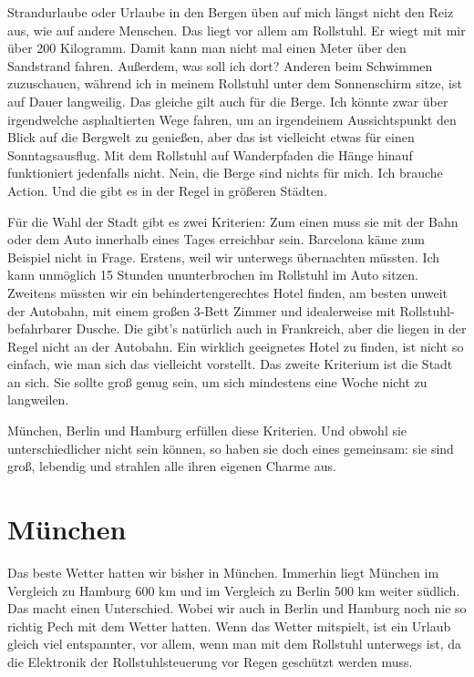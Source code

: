 \documentclass[fontsize=14pt,a4paper,headinclude,DIV=calc,automark]{scrbook}
\begin{document}
Strandurlaube oder Urlaube in den Bergen üben auf mich längst nicht den Reiz aus, wie auf andere Menschen. Das liegt vor allem am Rollstuhl. Er wiegt mit mir über 200 Kilogramm. Damit kann man nicht mal einen Meter über den Sandstrand fahren. Außerdem, was soll ich dort? Anderen beim Schwimmen zuzuschauen, während ich in meinem Rollstuhl unter dem Sonnenschirm sitze, ist auf Dauer langweilig. Das gleiche gilt auch für die Berge. Ich könnte zwar über irgendwelche asphaltierten Wege fahren, um an irgendeinem Aussichtspunkt den Blick auf die Bergwelt zu genießen, aber das ist vielleicht etwas für einen Sonntagsausflug. Mit dem Rollstuhl auf Wanderpfaden die Hänge hinauf funktioniert jedenfalls nicht. Nein, die Berge sind nichts für mich. Ich brauche Action. Und die gibt es in der Regel in größeren Städten.

Für die Wahl der Stadt gibt es zwei Kriterien: Zum einen muss sie mit der Bahn oder dem Auto innerhalb eines Tages erreichbar sein. Barcelona käme zum Beispiel nicht in Frage. Erstens, weil wir unterwegs übernachten müssten. Ich kann unmöglich 15 Stunden ununterbrochen im Rollstuhl im Auto sitzen. Zweitens müssten wir ein behindertengerechtes Hotel finden, am besten unweit der Autobahn, mit einem großen 3-Bett Zimmer und idealerweise mit Rollstuhl-befahrbarer Dusche. Die gibt’s natürlich auch in Frankreich, aber die liegen in der Regel nicht an der Autobahn. Ein wirklich geeignetes Hotel zu finden, ist nicht so einfach, wie man sich das vielleicht vorstellt. Das zweite Kriterium ist die Stadt an sich. Sie sollte groß genug sein, um sich mindestens eine Woche nicht zu langweilen. 

München, Berlin und Hamburg erfüllen diese Kriterien. Und obwohl sie unterschiedlicher nicht sein können, so haben sie doch eines gemeinsam: sie sind groß, lebendig und strahlen alle ihren eigenen Charme aus.

\section{München}

Das beste Wetter hatten wir bisher in München. Immerhin liegt München im Vergleich zu Hamburg 600 km und im Vergleich zu Berlin 500 km weiter südlich. Das macht einen Unterschied. Wobei wir auch in Berlin und Hamburg noch nie so richtig Pech mit dem Wetter hatten. Wenn das Wetter mitspielt, ist ein Urlaub gleich viel entspannter, vor allem, wenn man mit dem Rollstuhl unterwegs ist, da die Elektronik der Rollstuhlsteuerung vor Regen geschützt werden muss.
\end{document}
